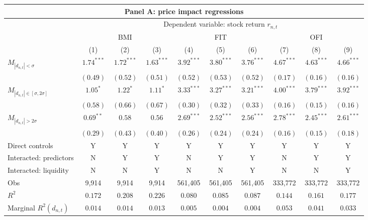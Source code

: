 \begin{tabular}{lccccccccc}
  \hline \multicolumn{10}{c}{Panel A: price impact regressions} \\
 \hline 
                                    & \multicolumn{9}{c}{Dependent variable: stock return $r_{n,t}$} \\

                                    \cmidrule(l){2-10} & \multicolumn{3}{c}{BMI} & \multicolumn{3}{c}{FIT} & \multicolumn{3}{c}{OFI} \\
 \cmidrule(l){2-4} \cmidrule(l){5-7} \cmidrule(l){8-10} 
  & (1) & (2) & (3) & (4) & (5) & (6) & (7) & (8) & (9) \\ 
  $M_{|d_{n,t}| < \sigma}$ & $1.74^{***}$ & $1.72^{***}$ & $1.63^{***}$ & $3.92^{***}$ & $3.80^{***}$ & $3.76^{***}$ & $4.67^{***}$ & $4.63^{***}$ & $4.66^{***}$ \\ 
   & $(0.49)$ & $(0.52)$ & $(0.51)$ & $(0.52)$ & $(0.53)$ & $(0.52)$ & $(0.17)$ & $(0.16)$ & $(0.16)$ \\ 
  $M_{|d_{n,t}| \in [\sigma, 2\sigma]}$ & $1.05^{*}$ & $1.22^{*}$ & $1.11^{*}$ & $3.33^{***}$ & $3.27^{***}$ & $3.21^{***}$ & $4.00^{***}$ & $3.79^{***}$ & $3.92^{***}$ \\ 
   & $(0.58)$ & $(0.66)$ & $(0.67)$ & $(0.30)$ & $(0.32)$ & $(0.33)$ & $(0.16)$ & $(0.15)$ & $(0.16)$ \\ 
  $M_{|d_{n,t}| > 2 \sigma}$ & $0.69^{**}$ & $0.58$ & $0.56$ & $2.69^{***}$ & $2.52^{***}$ & $2.56^{***}$ & $2.78^{***}$ & $2.45^{***}$ & $2.61^{***}$ \\ 
   \vspace{5pt} & $(0.29)$ & $(0.43)$ & $(0.40)$ & $(0.26)$ & $(0.24)$ & $(0.24)$ & $(0.16)$ & $(0.15)$ & $(0.18)$ \\ 
  Direct controls & Y & Y & Y & Y & Y & Y & Y & Y & Y \\ 
  Interacted: predictors & N & Y & Y & N & Y & Y & N & Y & Y \\ 
   \vspace{5pt}Interacted: liquidity & N & N & Y & N & N & Y & N & N & Y \\ 
  Obs & 9,914 & 9,914 & 9,914 & 561,405 & 561,405 & 561,405 & 333,772 & 333,772 & 333,772 \\ 
  $R^2$ & $0.172$ & $0.208$ & $0.226$ & $0.080$ & $0.085$ & $0.087$ & $0.144$ & $0.161$ & $0.177$ \\ 
  Marginal $R^2(d_{n,t})$ & $0.014$ & $0.014$ & $0.013$ & $0.005$ & $0.004$ & $0.004$ & $0.053$ & $0.041$ & $0.033$ \\ 

\end{tabular}
